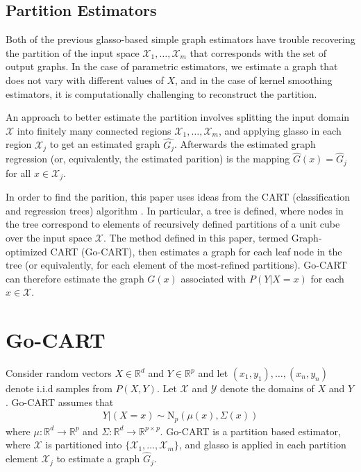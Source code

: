 \documentclass[12pt]{article}
\begin{document}
\subsection{Partition Estimators}
Both of the previous glasso-based simple graph estimators have trouble recovering the partition of the input space $\mathcal{X}_1,\ldots,\mathcal{X}_m$ that corresponds with the set of output graphs. In the case of parametric estimators, we estimate a graph that does not vary with different values of $X$, and in the case of kernel smoothing estimators, it is computationally challenging to reconstruct the partition.

An approach to better estimate the partition involves splitting the input domain $\mathcal{X}$ into finitely many connected regions $\mathcal{X}_1,\ldots,\mathcal{X}_m$, and applying glasso in each region $\mathcal{X}_j$ to get an estimated graph $\hat{G_j}$. Afterwards the estimated graph regression (or, equivalently, the estimated parition) is the mapping $\hat{G}(x) = \hat{G}_j$ for all $x \in \mathcal{X}_j$.

In order to find the parition, this paper uses ideas from the CART (classification and regression trees) algorithm \cite{breiman1993classification}. In particular, a tree is defined, where nodes in the tree correspond to elements of recursively defined partitions of a unit cube over the input space $\mathcal{X}$. The method defined in this paper, termed Graph-optimized CART (Go-CART), then estimates a graph for each leaf node in the tree (or equivalently, for each element of the most-refined partitions). Go-CART can therefore estimate the graph $G(x)$ associated with $P(Y | X=x)$ for each $x \in \mathcal{X}$.

\section{Go-CART}
Consider random vectors $X \in \mathbb{R}^d$ and $Y \in \mathbb{R}^p$ and let $(x_1,y_1),\ldots,(x_n,y_n)$ denote i.i.d samples from $P(X,Y)$. Let $\mathcal{X}$ and $\mathcal{Y}$ denote the domains of $X$ and $Y$. Go-CART assumes that
\begin{align}
    Y|(X=x) \sim \text{N}_p(\mu(x),\Sigma(x))
\end{align}
where $\mu:\mathbb{R}^d \rightarrow \mathbb{R}^p$ and $\Sigma:\mathbb{R}^d \rightarrow \mathbb{R}^{p \times p}$. Go-CART is a partition based estimator, where $\mathcal{X}$ is partitioned into $\{ \mathcal{X}_1,\ldots,\mathcal{X}_m \}$, and glasso is applied in each partition element $\mathcal{X}_j$ to estimate a graph $\hat{G}_j$.
\end{document}
